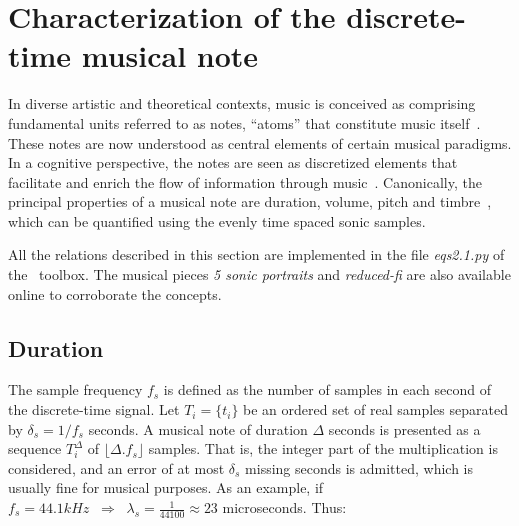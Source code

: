 

\section{Characterization of the discrete-time musical note} \label{sec:discNote}\label{sec:notaDisc}


In diverse artistic and theoretical contexts, music is conceived as comprising fundamental units referred to as notes, ``atoms'' that constitute music itself~\cite{Wisnick, Lovelock, Webern}.
These notes are now understood as central elements of certain musical paradigms. In a cognitive perspective, the notes are seen as discretized elements that facilitate and enrich the flow of information through music~\cite{Roederer, Lacerda}.
Canonically, the principal properties of a musical note are duration, volume, pitch and timbre~\cite{Lacerda}, which can be quantified using the evenly time spaced sonic samples.

All the relations described in this section are implemented in the file \emph{eqs2.1.py} of the \massa\ toolbox. The musical pieces \emph{5 sonic portraits} and \emph{reduced-fi} are also available online to corroborate the concepts.

\subsection{Duration}

The sample frequency $f_s$ is defined as the number of samples in each second of the discrete-time signal. Let $T_i=\{t_i\}$ be an ordered set of real samples separated by $\delta_s=1/f_s$ seconds. A musical note of duration $\Delta$ seconds is presented as a sequence $T_i^{\Delta}$ of $\lfloor \Delta . f_s \rfloor $ samples. That is, the integer part of the multiplication is considered, and an error of at most $\delta_s$ missing seconds is admitted, which is usually fine for musical purposes. As an example, if $f_s=44.1kHz \;\;\Rightarrow\;\;\lambda_s=\frac{1}{44100}\approx 23$ microseconds. Thus:


